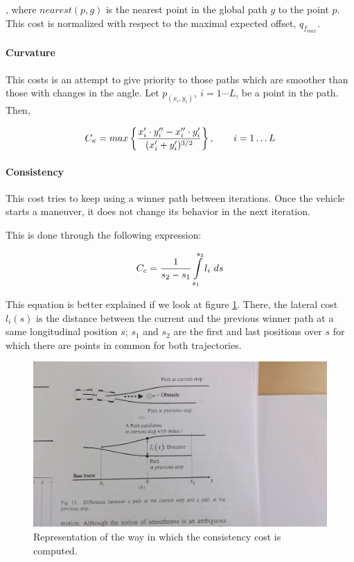 , where $nearest(p, g)$ is the nearest point in the global path $g$ to the point $p$. This cost is normalized with respect to the maximal expected offset, $q_{f_{max}}$.

\paragraph{Curvature}\label{ch:chapter07_01_04_00_04}

This costs is an attempt to give priority to those paths which are smoother than those with changes in the angle. Let $p_(x_i, y_i), ~ i=1\cdots L$, be a point in the path. Then, 

\begin{equation}\label{eq:cp07_curvature_cost}
C_{\kappa} = max \left \{ {{x_i' \cdot y_i'' - x_i'' \cdot y_i'} \over {(x_i' + y_i')^{3/2}}} \right \}, ~~~~~~ i=1 \dots L
\end{equation}

\paragraph{Consistency}\label{ch:chapter07_01_04_00_05}

This cost tries to keep using a winner path between iterations. Once the vehicle starts a maneuver, it does not change its behavior in the next iteration.

This is done through the following expression:

\begin{equation}\label{eq:cp07_consistency_cost}
C_c = {1 \over {s_2 - s_1}} \int \limits_{s_1}^{s_2} l_i ~ ds
\end{equation}

This equation is better explained if we look at figure \ref{fig:cp07_consistency_cost}. There, the lateral cost $l_i(s)$ is the distance between the current and the previous winner path at a same longitudinal position $s$; $s_1$ and $s_2$ are the first and last positions over $s$ for which there are points in common for both trajectories.

\begin{figure}[h!]
  \centering
  \includegraphics{consistency_cost}
  \caption{Representation of the way in which the consistency cost is computed.}\label{fig:cp07_consistency_cost}
\end{figure}

